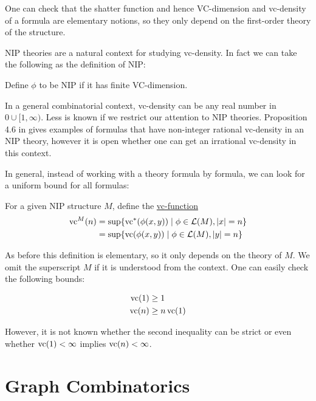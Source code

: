 \documentclass{amsart}
\renewcommand{\LL}{\mathcal L}
\newcommand{\defn}{\underline}
\begin{document}
One can check that the shatter function and hence VC-dimension and vc-density of a formula are elementary notions,
so they only depend on the first-order theory of the structure.

NIP theories are a natural context for studying vc-density.
In fact we can take the following as the definition of NIP:
\begin{Definition}
  Define $\phi$ to be NIP if it has finite VC-dimension. 
\end{Definition}

In a general combinatorial context,
vc-density can be any real number in $0 \cup [1, \infty)$.
Less is known if we restrict our attention to NIP theories.
Proposition 4.6 in \cite{vc_density} gives examples of formulas that have non-integer rational vc-density in an NIP theory,
however it is open whether one can get an irrational vc-density in this context.

In general, instead of working with a theory formula by formula, we can look for a uniform bound for all formulas:
\begin{Definition}
  For a given NIP structure $M$, define the \defn{vc-function}
  \begin{align*}
    \vc^M(n) &= \sup \{\vc^*(\phi(x, y)) \mid \phi \in \LL(M), |x| = n\} \\
             &= \sup \{\vc(\phi(x, y)) \mid \phi \in \LL(M), |y| = n\}
  \end{align*}
\end{Definition}

As before this definition is elementary, so it only depends on the theory of $M$.
We omit the superscript $M$ if it is understood from the context.
One can easily check the following bounds:
\begin{Lemma} 
  \begin{align*}
    \operatorname{vc}(1) &\geq 1 \\
    \operatorname{vc}(n) &\geq n\operatorname{vc}(1)
  \end{align*}  
\end{Lemma}

However, it is not known whether the second inequality can be strict or even whether $\operatorname{vc}(1) < \infty$ implies $\operatorname{vc}(n) < \infty$.

\section{Graph Combinatorics}
\end{document}
